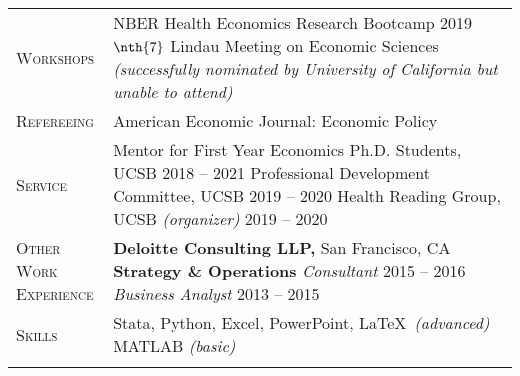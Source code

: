 \documentclass[11pt]{article}
\begin{document}
\begin{tabularx}{\textwidth}{@{}Y Z@{}}
	\textsc{Workshops} & 
	NBER Health Economics Research Bootcamp \hfill 2019%
	\vspace{6pt} \newline
	$\nth{7}$ Lindau Meeting on Economic Sciences \newline \textit{(successfully nominated by University of California but unable to attend)} 
	\\ \addlinespace[20pt] 
	
	\textsc{Refereeing}  & 
	American Economic Journal: Economic Policy
	 \\ \addlinespace[20pt] 
	
	\textsc{Service} & 
	Mentor for First Year Economics Ph.D. Students, UCSB \hfill 2018 -- 2021%
	\vspace{3pt} \newline
	Professional Development Committee, UCSB \hfill 2019 -- 2020%
	\vspace{3pt} \newline
	Health Reading Group, UCSB \textit{(organizer)} \hfill 2019 -- 2020%
	\\ \addlinespace[20pt] 
	
	
	\textsc{Other Work \newline Experience}  & 
	\textbf{Deloitte Consulting LLP,} San Francisco, CA
	\vspace{0pt} \newline
	\textbf{Strategy \& Operations} 
	\vspace{3pt} \newline
	\textit{Consultant} \hfill 2015 -- 2016%
	\vspace{0pt} \newline
	\textit{Business Analyst} \hfill 2013 -- 2015%
	\\ \addlinespace[20pt] 
	
	\textsc{Skills}  & 
	Stata, Python, Excel, PowerPoint, \LaTeX \ \textit{(advanced)}
	\vspace{3pt} \newline
	MATLAB \textit{(basic)}
	\\ \addlinespace[20pt] 
	

\end{tabularx}
\end{document}
